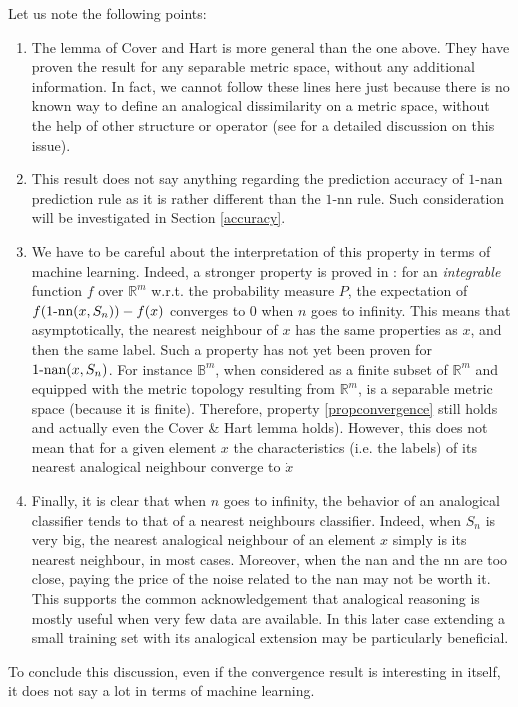 Let us note the following points:
\begin{enumerate}
\item The lemma of Cover and Hart is more general than the one above. They have
  proven the result for any separable metric space, without any additional
  information. In fact, we cannot follow these lines here just because there is
  no known way to define an analogical dissimilarity on a metric space, without
  the help of other structure or operator (see \cite{MicBayDelJAIR08} for a
  detailed discussion on this issue).
\item This result does not say anything regarding the prediction accuracy of
  $1\mbox{-nan}$ prediction rule as it is rather different than the
  $1\mbox{-nn}$ rule. Such consideration will be investigated in Section
  \ref{accuracy}.
\item We have to be careful about the interpretation of this property in terms
  of machine learning. Indeed, a stronger property is proved in
  \cite{CovHarTIT67}: for an {\it integrable} function $f$  over $\mathbb{R}^m$
  w.r.t. the probability measure $P$, the expectation of
  $f(1\mbox{-nn}(x,S_n))- f(x)$ converges to 0 when $n$ goes to infinity.
  This means that asymptotically, the nearest neighbour of $x$ has the same
  properties as $x$, and then the same label. Such a property has not yet been
  proven for $1\mbox{-nan}(x, S_n)$.
  For instance $\mathbb{B}^m$, when considered as a finite
  subset of $\mathbb{R}^m$ and equipped with the metric topology resulting from
  $\mathbb{R}^m$, is a separable metric space (because it is finite).
  Therefore, property \ref{propconvergence} still holds and actually even the
  Cover \& Hart lemma holds). However, this does not mean that for a given
  element $x$ the characteristics (i.e. the labels) of its nearest analogical
  neighbour converge to $\dot{x}$
\item Finally, it is clear that when $n$ goes to infinity, the behavior of an
  analogical classifier tends to that of a nearest neighbours classifier.
  Indeed, when $S_n$ is very big, the nearest analogical neighbour of an
  element $x$ simply is its nearest neighbour, in most cases. Moreover, when
  the nan and the nn are too close, paying the price of the noise related to
  the nan may not be worth it. This supports the common acknowledgement that
  analogical reasoning is mostly useful when very few data are available.
    In this later case extending a small training set with its analogical
    extension may be particularly beneficial.



\end{enumerate}
To conclude this discussion, even if the convergence result is interesting in
itself, it does not say a lot in terms of machine learning.

